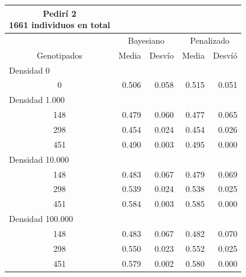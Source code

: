 \documentclass[11pt,spanish,a4paper,oneside,]{book} %
\begin{document}
\begin{longtable}{crrrr}
\caption*{
{\large Pedirí 2} \\ 
{\small 1661 individuos en total}
} \\ 
\toprule
 & \multicolumn{2}{c}{Bayesiano} & \multicolumn{2}{c}{Penalizado} \\ 
 \cmidrule(lr){2-3} \cmidrule(lr){4-5}
Genotipados & Media & Desvío & Media & Desvíó \\ 
\midrule
\multicolumn{1}{l}{Densidad 0} \\ 
\midrule
0 & 0.506 & 0.058 & 0.515 & 0.051 \\ 
\midrule
\multicolumn{1}{l}{Densidad 1.000} \\ 
\midrule
148 & 0.479 & 0.060 & 0.477 & 0.065 \\ 
298 & 0.454 & 0.024 & 0.454 & 0.026 \\ 
451 & 0.490 & 0.003 & 0.495 & 0.000 \\ 
\midrule
\multicolumn{1}{l}{Densidad 10.000} \\ 
\midrule
148 & 0.483 & 0.067 & 0.479 & 0.069 \\ 
298 & 0.539 & 0.024 & 0.538 & 0.025 \\ 
451 & 0.584 & 0.003 & 0.585 & 0.000 \\ 
\midrule
\multicolumn{1}{l}{Densidad 100.000} \\ 
\midrule
148 & 0.483 & 0.067 & 0.482 & 0.070 \\ 
298 & 0.550 & 0.023 & 0.552 & 0.025 \\ 
451 & 0.579 & 0.002 & 0.580 & 0.000 \\ 
 \bottomrule
\end{longtable}
\captionsetup[table]{labelformat=empty,skip=1pt}
\end{document}
